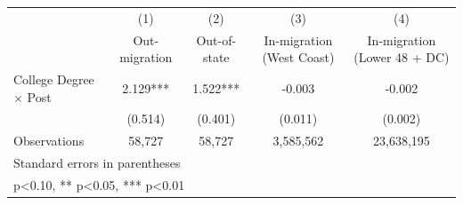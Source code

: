 {
\def\sym#1{\ifmmode^{#1}\else\(^{#1}\)\fi}
\begin{tabular}{l*{4}{c}}
\hline\hline
            &\multicolumn{1}{c}{(1)}&\multicolumn{1}{c}{(2)}&\multicolumn{1}{c}{(3)}&\multicolumn{1}{c}{(4)}\\
            &\multicolumn{1}{c}{Out-migration}&\multicolumn{1}{c}{Out-of-state}&\multicolumn{1}{c}{In-migration (West Coast)}&\multicolumn{1}{c}{In-migration (Lower 48 + DC)}\\
\hline
College Degree $\times$ Post&       2.129***&       1.522***&      -0.003   &      -0.002   \\
            &     (0.514)   &     (0.401)   &     (0.011)   &     (0.002)   \\
\hline
Observations&      58,727   &      58,727   &   3,585,562   &  23,638,195   \\
\hline\hline
\multicolumn{5}{l}{\footnotesize Standard errors in parentheses}\\
\multicolumn{5}{l}{\footnotesize * p<0.10, ** p<0.05, *** p<0.01}\\
\end{tabular}
}
